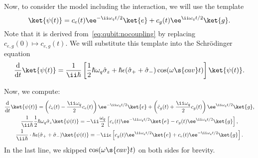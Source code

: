 \documentclass[fontsize=9pt,twoside=semi,bookmarkpackage=false]{scrartcl}
\renewcommand{\hbar}{\hslash}
\begin{document}
Now, to consider the model including the interaction, we will use the template
\begin{equation}
  \ket{ \psi (t) }
  =
  c_e (t) \ee^{ - \ii \omega_q t / 2 } \ket{ e }
  +
  c_g (t) \ee^{ \ii \omega_q t / 2 } \ket{ g }.
\end{equation}
Note that it is derived from~\cref{eq:qubit:nocoupling} by replacing $c_{e,g } (0) \mapsto c_{e,g } (t)$.
We will substitute this template into the Schrödinger equation
\begin{equation}
  \diff{}{ t} \ket{ \psi(t) }
  = \frac{ 1 }{ \ii \hbar }
  \left[
    \frac 12 \hbar \omega_q \hat \sigma_z
    +
    \hbar \epsilon ( \hat \sigma_+ + \hat \sigma_- )
    \cos ( \omega\s{cav} t )
  \right]
  \ket{ \psi (t) }.
\end{equation}

Now, we compute:
\begin{gather}
  \label{eq:rabi:lhs}
  \diff{}{ t } \ket{ \psi (t) }
  =
  \left( \dot c_e (t) - \frac{ \ii \omega_q  }{ 2 } c_e (t) \right) \ee^{ - \ii \omega_ q t / 2 } \ket{ e }
  +
  \left( \dot c_g (t) + \frac{\ii \omega_q}{2} c_g (t)\right) \ee^{ \ii \omega_ q t / 2 } \ket{ g },
  \\
  \label{eq:rabi:own}
  \frac{ 1 }{ \ii \hbar } \frac 12 \hbar \omega_q \hat \sigma_z \ket{ \psi (t) }
  = - \ii \frac{ \omega_ q }{ 2 }
  \left[
    c_e (t) \ee^ { - \ii \omega_q t / 2 }  \ket{ e }
    - c_g (t ) \ee^ { \ii \omega_q t / 2 } \ket { g }
  \right],
  \\
  \frac{ 1 }{ \ii \hbar } \cdot \hbar \epsilon ( \hat \sigma_+ + \hat \sigma_- )
  \ket{ \psi (t) }
  =
  - \ii \epsilon
  \left[
  c_g (t) \ee^{ \ii \omega_q t / 2 } \ket{ e }
  +
  c_e (t) \ee^{ - \ii \omega_q t / 2 } \ket{ g }
  \right].
\end{gather}
In the last line, we skipped $\cos( \omega\s{cav} t )$ on both sides for brevity.
\end{document}
